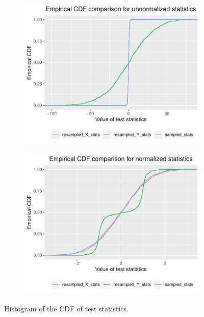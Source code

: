 \documentclass{article}
\begin{document}
\begin{figure}[!h]
    \begin{subfigure}{.5\textwidth}
        \centering
        \includegraphics[scale = 0.6]{Figures/Q2/emp_CDF_unnormalized_statistics.pdf}        
    \end{subfigure}
    \begin{subfigure}{.5\textwidth}
        \centering
        \includegraphics[scale = 0.6]{Figures/Q2/emp_CDF_normalized_statistics.pdf}        
    \end{subfigure}
    \caption{Histogram of the CDF of test statistics.}
    \label{fig:histogram_statistics}
\end{figure}
\end{document}
